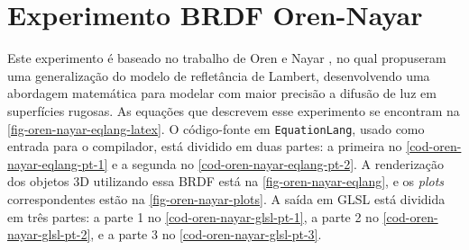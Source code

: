 
\section{Experimento BRDF Oren-Nayar} \label{section-experiment-oren-nayar}

Este experimento é baseado no trabalho de Oren e Nayar \cite{oren1994generalization}, no qual propuseram uma generalização do modelo de refletância de Lambert, desenvolvendo uma abordagem matemática para modelar com maior precisão a difusão de luz em superfícies rugosas. As equações que descrevem esse experimento se encontram na \autoref{fig-oren-nayar-eqlang-latex}. O código-fonte em \texttt{EquationLang}, usado como entrada para o compilador, está dividido em duas partes: a primeira no \autoref{cod-oren-nayar-eqlang-pt-1} e a segunda no \autoref{cod-oren-nayar-eqlang-pt-2}. A renderização dos objetos 3D utilizando essa BRDF está na \autoref{fig-oren-nayar-eqlang}, e os \textit{plots} correspondentes estão na \autoref{fig-oren-nayar-plots}. A saída em GLSL está dividida em três partes: a parte 1 no \autoref{cod-oren-nayar-glsl-pt-1}, a parte 2 no \autoref{cod-oren-nayar-glsl-pt-2}, e a parte 3 no \autoref{cod-oren-nayar-glsl-pt-3}.


